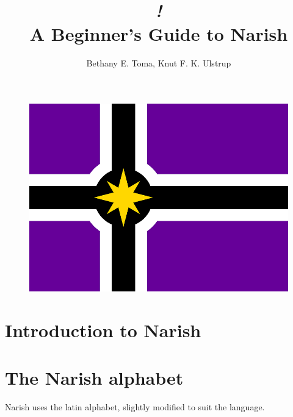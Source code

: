 \documentclass[a5paper,10pt,twoside,openright]{memoir}
\title{{\fontsize{70}{70}\selectfont \itshape \famword{i}{f}{aa}{m}{ak}!} \\ \fontsize{25}{30} \sffamily A Beginner's Guide to Narish}
\author{Bethany E. Toma, Knut F. K. Ulstrup}
\date{}%
\begin{document}
\begin{titlingpage}
    \maketitle
    \begin{figure}[ht]
        \includegraphics[width=\textwidth]{nareland3small.png}
    \end{figure}
\end{titlingpage}

\frontmatter

\newpage

\tableofcontents

\mainmatter

\chapter{Introduction to Narish}

\chapter{The Narish alphabet}

Narish uses the latin alphabet, slightly modified to suit the language.
\end{document}
